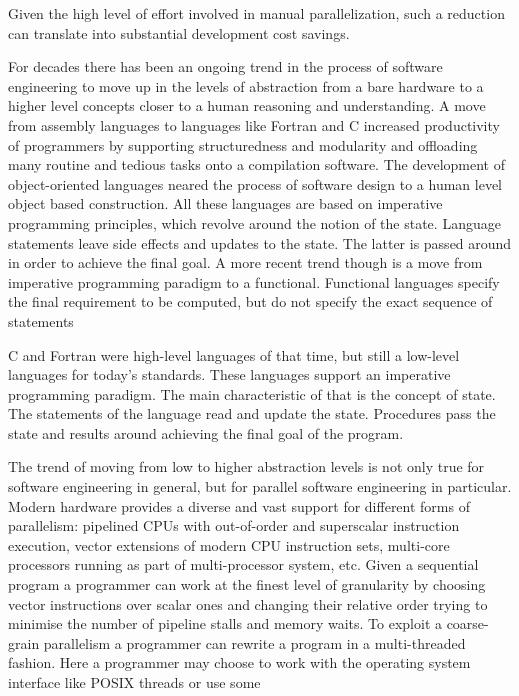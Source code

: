 %
Given the high level of effort involved in manual parallelization, such a reduction can translate into substantial development cost savings.


\quad For decades there has been an ongoing trend in the process of software engineering to move up in the levels of abstraction from a bare hardware to a higher level concepts closer to a human reasoning and understanding.\newline\null
\quad A move from assembly languages to languages like Fortran and C increased productivity of programmers by supporting structuredness and modularity and offloading many routine and tedious tasks onto a compilation software. The development of object-oriented languages neared the process of software design to a human level object based construction. All these languages are based on imperative programming principles, which revolve around the notion of the state. Language statements leave side effects and updates to the state. The latter is passed around in order to achieve the final goal. A more recent trend though is a move from imperative programming paradigm to a functional. Functional languages specify the final requirement to be computed, but do not specify the exact sequence of statements   


C and Fortran were high-level languages of that time, but still a low-level languages for today's standards. These languages support an imperative programming paradigm. The main characteristic of that is the concept of state. The statements of the language read and update the state. Procedures pass the state and results around achieving the final goal of the program.   

\quad The trend of moving from low to higher abstraction levels is not only true for software engineering in general, but for parallel software engineering in particular. Modern hardware provides a diverse and vast support for different forms of parallelism: pipelined CPUs with out-of-order and superscalar instruction execution, vector extensions of modern CPU instruction sets, multi-core processors running as part of multi-processor system, etc. Given a sequential program a programmer can work at the finest level of granularity by choosing vector instructions over scalar ones and changing their relative order trying to minimise the number of pipeline stalls and memory waits. To exploit a coarse-grain parallelism a programmer can rewrite a program in a multi-threaded fashion. Here a programmer may choose to work with the operating system interface like POSIX threads or use some 

